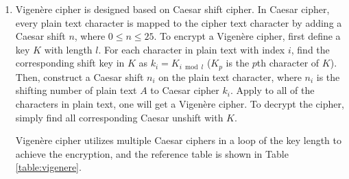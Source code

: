 \documentclass[12pt]{article}
\begin{document}
\begin{enumerate}
	\item Vigenère cipher is designed based on Caesar shift cipher. In Caesar cipher, every plain text character is mapped to the cipher text character by adding a Caesar shift $n$, where $0 \le n \le 25$. To encrypt a Vigenère cipher, first define a key $K$ with length $l$. For each character in plain text with index $i$, find the corresponding shift key in $K$ as $k_i=K_{i \bmod l}$ (${K_p}$ is the $p$th character of $K$). Then, construct a Caesar shift $n_i$ on the plain text character, where $n_i$ is the shifting number of plain text $A$ to Caesar cipher $k_i$. Apply to all of the characters in plain text, one will get a Vigenère cipher. To decrypt the cipher, simply find all corresponding Caesar unshift with $K$.

	Vigenère cipher utilizes multiple Caesar ciphers in a loop of the key length to achieve the encryption, and the reference table is shown in Table \ref{table:vigenere}.


\end{enumerate}
\end{document}
